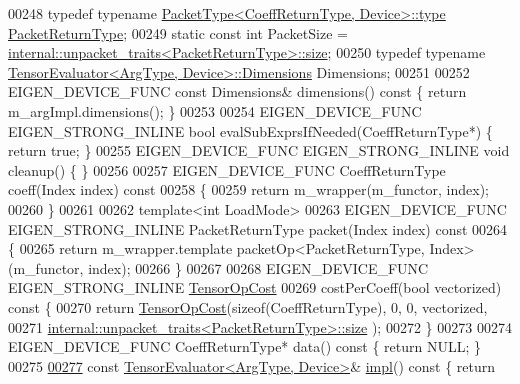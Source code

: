 \begin{DoxyCode}
00248   \textcolor{keyword}{typedef} \textcolor{keyword}{typename} \hyperlink{group___sparse_core___module}{PacketType<CoeffReturnType, Device>::type} 
      \hyperlink{group___sparse_core___module}{PacketReturnType};
00249   \textcolor{keyword}{static} \textcolor{keyword}{const} \textcolor{keywordtype}{int} PacketSize = 
      \hyperlink{struct_eigen_1_1internal_1_1unpacket__traits}{internal::unpacket\_traits<PacketReturnType>::size};
00250   \textcolor{keyword}{typedef} \textcolor{keyword}{typename} \hyperlink{struct_eigen_1_1_tensor_evaluator}{TensorEvaluator<ArgType, Device>::Dimensions}
       Dimensions;
00251 
00252   EIGEN\_DEVICE\_FUNC \textcolor{keyword}{const} Dimensions& dimensions()\textcolor{keyword}{ const }\{ \textcolor{keywordflow}{return} m\_argImpl.dimensions(); \}
00253 
00254   EIGEN\_DEVICE\_FUNC EIGEN\_STRONG\_INLINE \textcolor{keywordtype}{bool} evalSubExprsIfNeeded(CoeffReturnType*) \{ \textcolor{keywordflow}{return} \textcolor{keyword}{true}; \}
00255   EIGEN\_DEVICE\_FUNC EIGEN\_STRONG\_INLINE \textcolor{keywordtype}{void} cleanup() \{ \}
00256 
00257   EIGEN\_DEVICE\_FUNC CoeffReturnType coeff(Index index)\textcolor{keyword}{ const}
00258 \textcolor{keyword}{  }\{
00259     \textcolor{keywordflow}{return} m\_wrapper(m\_functor, index);
00260   \}
00261 
00262   \textcolor{keyword}{template}<\textcolor{keywordtype}{int} LoadMode>
00263   EIGEN\_DEVICE\_FUNC EIGEN\_STRONG\_INLINE PacketReturnType packet(Index index)\textcolor{keyword}{ const}
00264 \textcolor{keyword}{  }\{
00265     \textcolor{keywordflow}{return} m\_wrapper.template packetOp<PacketReturnType, Index>(m\_functor, index);
00266   \}
00267 
00268   EIGEN\_DEVICE\_FUNC EIGEN\_STRONG\_INLINE \hyperlink{class_eigen_1_1_tensor_op_cost}{TensorOpCost}
00269   costPerCoeff(\textcolor{keywordtype}{bool} vectorized)\textcolor{keyword}{ const }\{
00270     \textcolor{keywordflow}{return} \hyperlink{class_eigen_1_1_tensor_op_cost}{TensorOpCost}(\textcolor{keyword}{sizeof}(CoeffReturnType), 0, 0, vectorized,
00271                         \hyperlink{struct_eigen_1_1internal_1_1unpacket__traits}{internal::unpacket\_traits<PacketReturnType>::size}
      );
00272   \}
00273 
00274   EIGEN\_DEVICE\_FUNC CoeffReturnType* data()\textcolor{keyword}{ const }\{ \textcolor{keywordflow}{return} NULL; \}
00275 
\hyperlink{struct_eigen_1_1_tensor_evaluator_3_01const_01_tensor_cwise_nullary_op_3_01_nullary_op_00_01_arg_type_01_4_00_01_device_01_4_a72a3fd3dcff859c87f7eb5d634d35f21}{00277}   \textcolor{keyword}{const} \hyperlink{struct_eigen_1_1_tensor_evaluator}{TensorEvaluator<ArgType, Device>}& \hyperlink{struct_eigen_1_1_tensor_evaluator_3_01const_01_tensor_cwise_nullary_op_3_01_nullary_op_00_01_arg_type_01_4_00_01_device_01_4_a72a3fd3dcff859c87f7eb5d634d35f21}{impl}()\textcolor{keyword}{ const }\{ \textcolor{keywordflow}{return} 

\end{DoxyCode}
